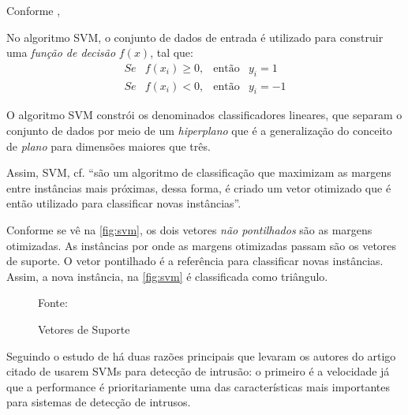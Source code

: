 Conforme ,
\begin{citacao}
	No algoritmo SVM, o conjunto de dados de entrada é utilizado para construir uma \textit{função de decisão} $f(x)$, tal que:	
		\begin{equation}
			\begin{matrix}
				Se & f(x_i) \ge 0, &\textrm{então}&  y_i = 1   \\
				Se & f(x_i) < 0,   &\textrm{então}&  y_i = -1   
			\end{matrix}
		\end{equation}

	O algoritmo SVM constrói os denominados classificadores lineares, que separam o conjunto de dados por meio de um \textit{hiperplano} que é a generalização do conceito de \textit{plano} para dimensões maiores que três.	
\end{citacao}

Assim, SVM, cf.  ``são um algoritmo de classificação que maximizam as margens entre instâncias mais próximas, dessa forma, é criado um vetor otimizado que é então utilizado para classificar novas instâncias''.

Conforme se vê na \autoref{fig:svm}, os dois vetores \textit{não pontilhados} são as margens otimizadas. As instâncias por onde as margens otimizadas passam são os vetores de suporte. O vetor pontilhado é a referência para classificar novas instâncias. Assim, a nova instância, na \autoref{fig:svm} é classificada como triângulo.

\begin{figure}[h!]
	\centering
	\caption{Vetores de Suporte}
	
	\label{fig:svm}
	{\scriptsize 	Fonte: }
\end{figure}

Seguindo o estudo de  há duas razões principais que levaram os autores do artigo citado de usarem SVMs para detecção de intrusão: o primeiro é a velocidade já que a performance é prioritariamente uma das características mais importantes para sistemas de detecção de intrusos. 

